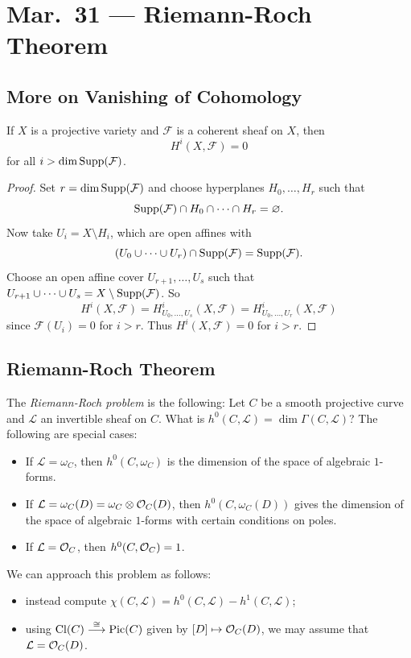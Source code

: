 \chapter{Mar.~31 --- Riemann-Roch Theorem}

\section{More on Vanishing of Cohomology}

\begin{theorem}
  If $X$ is a projective variety
  and $\mathcal{F}$ is a
  coherent sheaf on $X$, then
  \[
    H^i(X, \mathcal{F}) = 0
  \]
  for all $i > \dim \operatorname{Supp}(\mathcal{F})$.
\end{theorem}

\begin{proof}
  Set $r = \dim \operatorname{Supp}(\mathcal{F})$ and choose
  hyperplanes $H_0, \dots, H_r$ such that
  \[
    \operatorname{Supp}(\mathcal{F})
    \cap H_0 \cap \dots \cap H_r = \varnothing.
  \]
  Now take $U_i = X \setminus H_i$, which
  are open affines with
  \[
    (U_0 \cup \dots \cup U_r) \cap \operatorname{Supp}(\mathcal{F}) = \operatorname{Supp}(\mathcal{F}).
  \]
  Choose an open affine cover
  $U_{r + 1}, \dots, U_s$ such that
  $U_{r + 1} \cup \cdots \cup U_s = X \setminus \operatorname{Supp}(\mathcal{F})$.
  So
  \[
    H^i(X, \mathcal{F})
    = H^i_{U_0, \dots, U_s}(X, \mathcal{F})
    = H^i_{U_0, \dots, U_r}(X, \mathcal{F})
  \]
  since $\mathcal{F}(U_i) = 0$ for $i > r$.
  Thus $H^i(X, \mathcal{F}) = 0$ for $i > r$.
\end{proof}

\section{Riemann-Roch Theorem}

\begin{remark}
  The \emph{Riemann-Roch problem} is the following:
  Let $C$ be a smooth projective curve and
  $\mathcal{L}$ an invertible sheaf on $C$.
  What is $h^0(C, \mathcal{L}) = \dim \Gamma(C, \mathcal{L})$?
  The following are special cases:
  \begin{itemize}
    \item If $\mathcal{L} = \omega_C$, then
      $h^0(C, \omega_C)$ is the dimension
      of the space of algebraic $1$-forms.
    \item If $\mathcal{L} = \omega_C(D) = \omega_C \otimes \mathcal{O}_C(D)$,
      then $h^0(C, \omega_C(D))$
      gives the dimension of the space of algebraic $1$-forms
      with certain conditions on poles.
    \item If $\mathcal{L} = \mathcal{O}_C$, then
      $h^0(C, \mathcal{O}_C) = 1$.
  \end{itemize}
  We can approach this problem as follows:
  \begin{itemize}
    \item instead compute
      $\chi(C, \mathcal{L}) = h^0(C, \mathcal{L}) - h^1(C, \mathcal{L})$;
    \item using $\operatorname{Cl}(C) \overset{\cong}{\longrightarrow} \operatorname{Pic}(C)$
      given by $[D] \mapsto \mathcal{O}_C(D)$,
      we may assume that $\mathcal{L} = \mathcal{O}_C(D)$.
  \end{itemize}
\end{remark}

